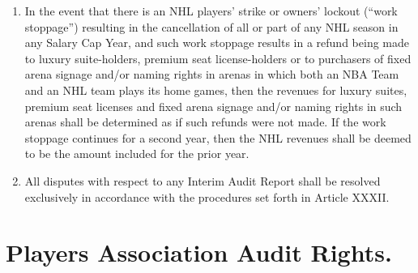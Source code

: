 \documentclass[
]{book}
\begin{document}
\begin{enumerate}
\item
  In the event that there is an NHL players' strike or owners' lockout (``work stoppage'') resulting in the cancellation of all or part of any NHL season in any Salary Cap Year, and such work stoppage results in a refund being made to luxury suite-holders, premium seat license-holders or to purchasers of fixed arena signage and/or naming rights in arenas in which both an NBA Team and an NHL team plays its home games, then the revenues for luxury suites, premium seat licenses and fixed arena signage and/or naming rights in such arenas shall be determined as if such refunds were not made. If the work stoppage continues for a second year, then the NHL revenues shall be deemed to be the amount included for the prior year.
\item
  All disputes with respect to any Interim Audit Report shall be resolved exclusively in accordance with the procedures set forth in Article XXXII.
\end{enumerate}

\hypertarget{players-association-audit-rights.}{%
\section{Players Association Audit Rights.}\label{players-association-audit-rights.}}
\end{document}
